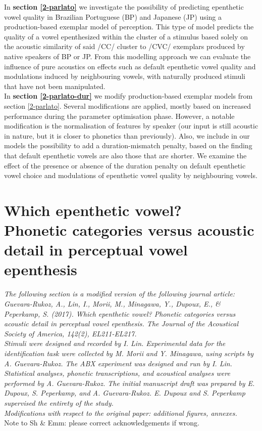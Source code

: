 {In \textbf{section \ref{2-parlato}} we investigate the possibility of predicting epenthetic vowel quality in Brazilian Portuguese (BP) and Japanese (JP) using a production-based exemplar model of perception. This type of model predicts the quality of a vowel epenthesized within the cluster of a stimulus based solely on the acoustic similarity of said /CC/ cluster to /CVC/ exemplars produced by native speakers of BP or JP. From this modelling approach we can evaluate the influence of pure acoustics on effects such as default epenthetic vowel quality and modulations induced by neighbouring vowels, with naturally produced stimuli that have not been manipulated. \\

In \textbf{section \ref{2-parlato-dur}} we modify production-based exemplar models from section \ref{2-parlato}. Several modifications are applied, mostly based on increased performance during the parameter optimisation phase. However, a notable modification is the normalisation of features by speaker (our input is still acoustic in nature, but it is closer to phonetics than previously). Also, we include in our models the possibility to add a duration-mismatch penalty, based on the finding that default epenthetic vowels are also those that are shorter. We examine the effect of the presence or absence of the duration penalty on default epenthetic vowel choice and modulations of epenthetic vowel quality by neighbouring vowels.   
}


\section{Which epenthetic vowel? \\ Phonetic categories versus acoustic detail in perceptual vowel epenthesis} \label{2-ahpa}

\small{\textit{{\color{darkgray}The following section is a modified version of the following journal article: \\
Guevara-Rukoz, A., Lin, I., Morii, M., Minagawa, Y., Dupoux, E., \& Peperkamp, S. (2017). Which epenthetic vowel? Phonetic categories versus acoustic detail in perceptual vowel epenthesis. The Journal of the Acoustical Society of America, 142(2), EL211-EL217. \\
Stimuli were designed and recorded by I. Lin.
Experimental data for the identification task were collected by M. Morii and Y. Minagawa, using scripts by A. Guevara-Rukoz. The ABX experiment was designed and run by I. Lin.
Statistical analyses, phonetic transcriptions, and acoustical analyses were performed by A. Guevara-Rukoz.
The initial manuscript draft was prepared by E. Dupoux, S. Peperkamp, and A. Guevara-Rukoz.
E. Dupoux and S. Peperkamp supervised the entirety of the study.\\
Modifications with respect to the original paper: additional figures, annexes.\\}}}
{\color{red}Note to Sh \& Emm: please correct acknowledgements if wrong.}

